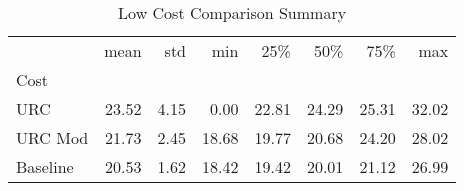 \begin{table}
\caption{Low Cost Comparison Summary}
\begin{tabular}{lrrrrrrr}
\toprule
 & mean & std & min & 25\% & 50\% & 75\% & max \\
Cost &  &  &  &  &  &  &  \\
\midrule
URC & 23.52 & 4.15 & 0.00 & 22.81 & 24.29 & 25.31 & 32.02 \\
URC Mod & 21.73 & 2.45 & 18.68 & 19.77 & 20.68 & 24.20 & 28.02 \\
Baseline & 20.53 & 1.62 & 18.42 & 19.42 & 20.01 & 21.12 & 26.99 \\
\bottomrule
\end{tabular}
\end{table}
